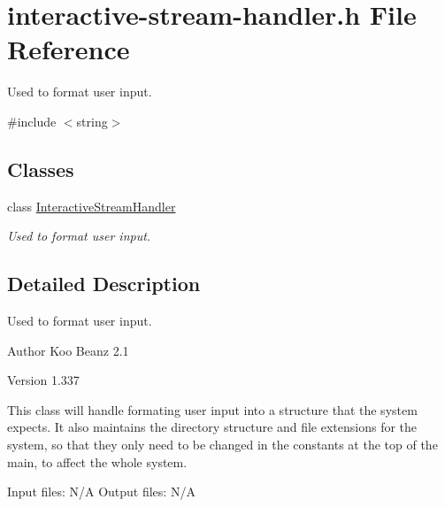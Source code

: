 \hypertarget{interactive-stream-handler_8h}{
\section{interactive-\/stream-\/handler.h File Reference}
\label{interactive-stream-handler_8h}
}


Used to format user input.  


{\ttfamily \#include $<$string$>$}\par
\subsection*{Classes}
\begin{DoxyCompactItemize}
\item 
class \hyperlink{classInteractiveStreamHandler}{InteractiveStreamHandler}
\begin{DoxyCompactList}\small\item\em Used to format user input. \item\end{DoxyCompactList}\end{DoxyCompactItemize}


\subsection{Detailed Description}
Used to format user input. \begin{DoxyAuthor}{Author}
Koo Beanz 2.1 
\end{DoxyAuthor}
\begin{DoxyVersion}{Version}
1.337
\end{DoxyVersion}
This class will handle formating user input into a structure that the system expects. It also maintains the directory structure and file extensions for the system, so that they only need to be changed in the constants at the top of the main, to affect the whole system.

Input files: N/A Output files: N/A 